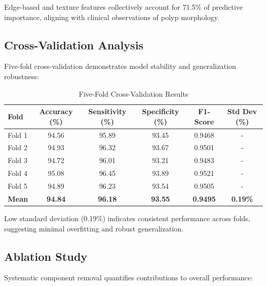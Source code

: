 \documentclass[11pt,a4paper]{article}
\begin{document}
Edge-based and texture features collectively account for 71.5\% of predictive importance, aligning with clinical observations of polyp morphology.

\subsection{Cross-Validation Analysis}

Five-fold cross-validation demonstrates model stability and generalization robustness:

\begin{table}[H]
\centering
\caption{Five-Fold Cross-Validation Results}
\begin{tabular}{lccccc}
\toprule
\textbf{Fold} & \textbf{Accuracy (\%)} & \textbf{Sensitivity (\%)} & \textbf{Specificity (\%)} & \textbf{F1-Score} & \textbf{Std Dev (\%)} \\
\midrule
Fold 1 & 94.56 & 95.89 & 93.45 & 0.9468 & - \\
Fold 2 & 94.93 & 96.32 & 93.67 & 0.9501 & - \\
Fold 3 & 94.72 & 96.01 & 93.21 & 0.9483 & - \\
Fold 4 & 95.08 & 96.45 & 93.89 & 0.9521 & - \\
Fold 5 & 94.89 & 96.23 & 93.54 & 0.9505 & - \\
\midrule
\textbf{Mean} & \textbf{94.84} & \textbf{96.18} & \textbf{93.55} & \textbf{0.9495} & \textbf{0.19\%} \\
\bottomrule
\end{tabular}
\label{tab:crossval}
\end{table}

Low standard deviation (0.19\%) indicates consistent performance across folds, suggesting minimal overfitting and robust generalization.

\subsection{Ablation Study}

Systematic component removal quantifies contributions to overall performance:
\end{document}
